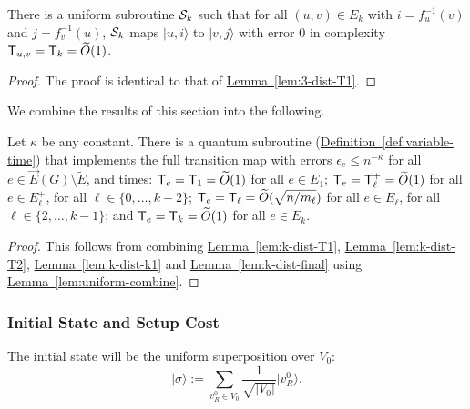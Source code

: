 \documentclass{theoretics}
\newcommand{\lem}[1]{\hyperref[lem:#1]{Lemma~\ref*{lem:#1}}}
\newcommand{\defin}[1]{\hyperref[def:#1]{Definition~\ref*{def:#1}}}
\def\ket#1{{\lvert}#1\rangle}
\renewcommand{\>}{\rangle}
\newcommand{\<}{\langle}
\renewcommand{\(}{\left(}
\renewcommand{\)}{\right)}
\begin{document}
\begin{lemma}\label{lem:k-dist-final}
	There is a uniform subroutine ${\cal S}_k$ such that for all $(u,v)\in E_k$ with $i=f_u^{-1}(v)$ and $j=f_v^{-1}(u)$, ${\cal S}_k$ maps $\ket{u,i}$ to $\ket{v,j}$ with error 0 in complexity ${\sf T}_{u,v}={\sf T}_k=\widetilde{O}(1)$.
\end{lemma}
\begin{proof}
The proof is identical to that of \lem{3-dist-T1}.
\end{proof}


\noindent We combine the results of this section into the following.
\begin{corollary}\label{cor:k-dist-transitions}
Let $\kappa$ be any constant. There is a quantum subroutine (\defin{variable-time}) that implements the full transition map with errors $\epsilon_e\leq n^{-\kappa}$ for all $e\in \overrightarrow{E}(G)\setminus\tilde{E}$, and times: ${\sf T}_e={\sf T}_1=\widetilde{O}(1)$ for all $e\in E_1$; ${\sf T}_e={\sf T}_{\ell}^+=\widetilde{O}(1)$ for all $e\in E_{\ell}^+$, for all $\ell\in\{0,\dots,k-2\}$; ${\sf T}_e={\sf T}_{\ell}=\widetilde{O}(\sqrt{n/m_{\ell}})$ for all $e\in E_{\ell}$, for all $\ell\in\{2,\dots,k-1\}$; and ${\sf T}_e={\sf T}_k=\widetilde{O}(1)$ for all $e\in E_k$. 
\end{corollary}
\begin{proof}
This follows from combining \lem{k-dist-T1}, \lem{k-dist-T2}, \lem{k-dist-k1} and \lem{k-dist-final} using  \lem{uniform-combine}.
\end{proof}

\subsubsection{Initial State and Setup Cost}


The initial state will be the uniform superposition over $V_0$: 
\begin{equation*}
	\ket{\sigma} := \sum_{v^0_{R} \in V_0}\frac{1}{\sqrt{|V_0|}}\ket{v^0_{R}}.
\end{equation*}
\end{document}
